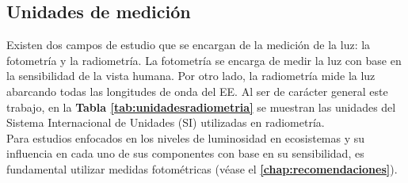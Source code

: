 \newpage

\subsection{Unidades de medición}

Existen dos campos de estudio que se encargan de la medición de la luz: la fotometría y la radiometría. La fotometría se encarga de medir la luz con base en la sensibilidad de la vista humana. Por otro lado, la radiometría mide la luz abarcando todas las longitudes de onda del EE. Al ser de carácter general este trabajo, en la \textbf{Tabla \ref{tab:unidadesradiometria}} se muestran las unidades del Sistema Internacional de Unidades (SI) utilizadas en radiometría.\\

Para estudios enfocados en los niveles de luminosidad en ecosistemas y su influencia en cada uno de sus componentes con base en su sensibilidad, es fundamental utilizar medidas fotométricas (véase el \textbf{\autoref{chap:recomendaciones}}).


\begin{table}[htb]
\centering
\caption{Unidades del SI utilizadas en radiometría \citep{Jurgen1968}}
\label{tab:unidadesradiometria}
\end{table}

\newpage

